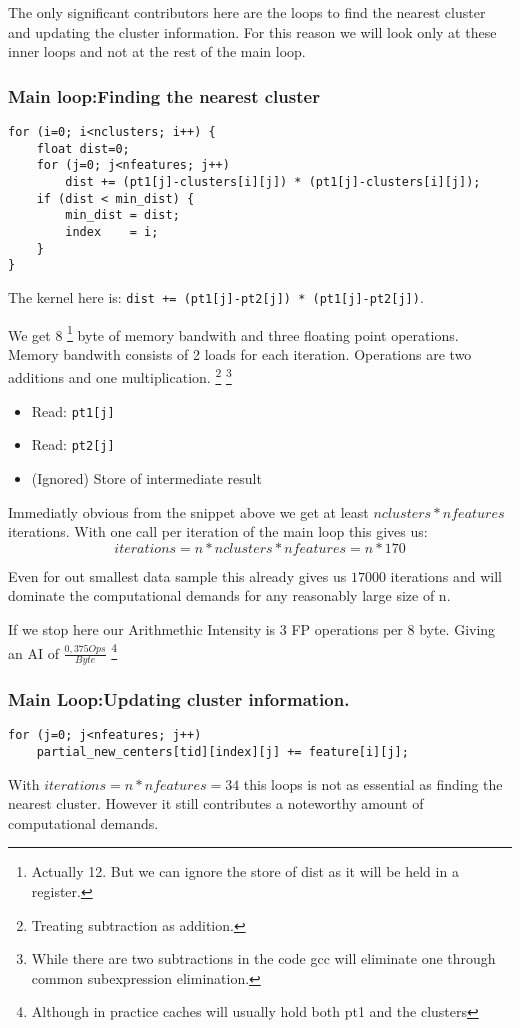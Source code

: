 \documentclass[]{article}
\begin{document}
The only significant contributors here are the loops to find the nearest cluster and updating the cluster information.
For this reason we will look only at these inner loops and not at the rest of the main loop.


\subsubsection{Main loop:Finding the nearest cluster}
\begin{lstlisting}[caption={Inlined representation of find\_nearest\_point}]
for (i=0; i<nclusters; i++) {
	float dist=0;
	for (j=0; j<nfeatures; j++)
		dist += (pt1[j]-clusters[i][j]) * (pt1[j]-clusters[i][j]);
	if (dist < min_dist) {
		min_dist = dist;
		index    = i;
	}
}
\end{lstlisting}
The kernel here is: \texttt{dist += (pt1[j]-pt2[j]) * (pt1[j]-pt2[j])}.\newline

We get 8
\footnote{Actually 12. But we can ignore the store of dist as it will be held in a register.}
byte of memory bandwith and three floating point operations.
Memory bandwith consists of 2 loads for each iteration.
Operations are two additions and one multiplication.
\footnote{Treating subtraction as addition.}
\footnote{While there are two subtractions in the code gcc will eliminate one through common subexpression elimination.}
\begin{itemize}[noitemsep,nolistsep]
	\item Read: \texttt{pt1[j]}
	\item Read: \texttt{pt2[j]}
	\item (Ignored) Store of intermediate result
\end{itemize}

Immediatly obvious from the snippet above we get at least $nclusters * nfeatures$ iterations.
With one call per iteration of the main loop this gives us:\\
$$iterations = n * nclusters * nfeatures = n * 170$$

Even for out smallest data sample this already gives us $17000$ iterations and will dominate the computational demands for any reasonably large size of n.

If we stop here our Arithmethic Intensity is 3 FP operations per 8 byte. Giving an AI of $\frac{0,375 Ops}{Byte}$
\footnote{Although in practice caches will usually hold both pt1 and the clusters}


\subsubsection{Main Loop:Updating cluster information.}
\begin{lstlisting}[caption={Updating (partial) cluster information}]
for (j=0; j<nfeatures; j++)
	partial_new_centers[tid][index][j] += feature[i][j];
\end{lstlisting}
With $iterations = n * nfeatures = 34$ this loops is not as essential as finding the nearest cluster.
However it still contributes a noteworthy amount of computational demands.
\end{document}
